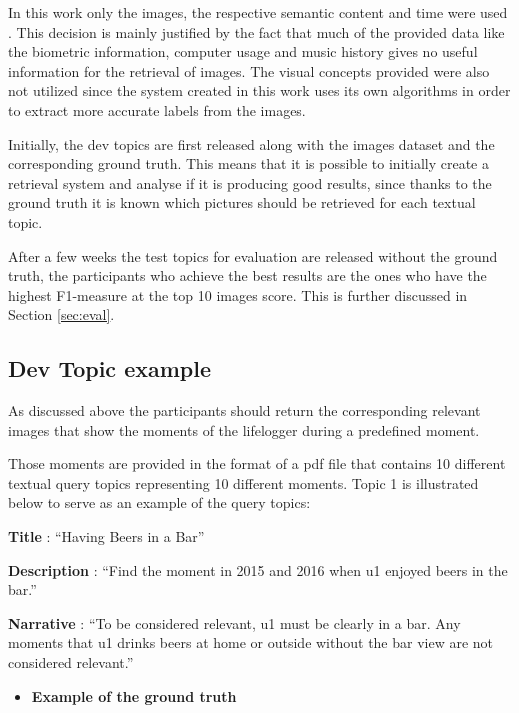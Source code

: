     
    In this work only the images, the respective semantic content and time were used \cite{Ribeiro2020}. This decision is mainly justified by the fact that much of the provided data like the biometric information, computer usage and music history gives no useful information for the retrieval of images. The visual concepts provided were also not utilized since the system created in this work uses its own algorithms in order to extract more accurate labels from the images. 
    

    Initially, the dev topics are first released along with the images dataset and the corresponding ground truth. This means that it is possible to initially create a retrieval system and analyse if it is producing good results, since thanks to the ground truth it is known which pictures should be retrieved for each textual topic. 

    After a few weeks the test topics for evaluation are released without the ground truth, the participants who achieve the best results are the ones who have the highest F1-measure at the top 10 images score. This is further discussed in Section \ref{sec:eval}.
    \newpage
    \subsection{Dev Topic example}
    \label{sec:devtopic1}
    As discussed above the participants should return the corresponding relevant images that show the moments of the lifelogger during a predefined moment. 
    
    Those moments are provided in the format of a pdf file that contains 10 different textual query topics representing 10 different moments. Topic 1 is illustrated below to serve as an example of the query topics:
    


   \hfill

        \textbf{Title} : ``Having Beers in a Bar”

        \textbf{Description} : ``Find the moment in 2015 and 2016 when u1 enjoyed beers in the bar.”

        \textbf{Narrative} : ``To be considered relevant, u1 must be clearly in a bar. Any moments that u1 drinks beers at home or outside without the bar view are not considered relevant.”
        


    
    \begin{itemize}
        \item    \textbf{Example of the ground truth}
    \end{itemize}
 


